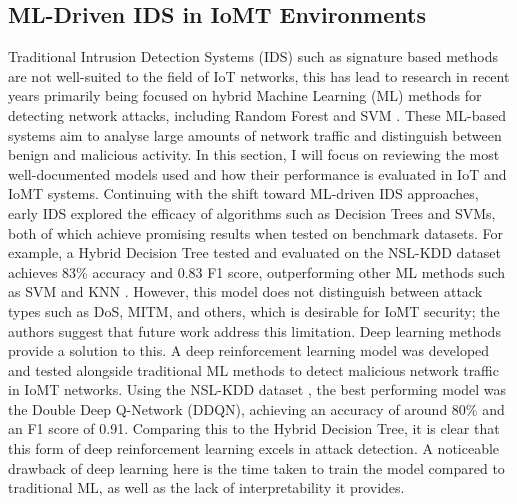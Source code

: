 \documentclass[11pt,a4paper]{article}
\begin{document}
\subsection{ML-Driven IDS in IoMT Environments}
Traditional Intrusion Detection Systems (IDS) such as signature based methods are not well-suited to the field of IoT networks, this has lead to research in recent years primarily being focused on hybrid Machine Learning (ML) methods for detecting network attacks, including Random Forest and SVM \cite{da2019internet}. These ML-based systems aim to analyse large amounts of network traffic and distinguish between benign and malicious activity. In this section, I will focus on reviewing the most well-documented models used and how their performance is evaluated in IoT and IoMT systems.
Continuing with the shift toward ML-driven IDS approaches, early IDS explored the efficacy of algorithms such as Decision Trees and SVMs, both of which achieve promising results when tested on benchmark datasets. For example, a Hybrid Decision Tree tested and evaluated on the NSL-KDD dataset \cite{5356528} achieves 83\% accuracy and 0.83 F1 score, outperforming other ML methods such as SVM and KNN \cite{taghavinejad2020intrusion}. However, this model does not distinguish between attack types such as DoS, MITM, and others, which is desirable for IoMT security; the authors suggest that future work address this limitation.
Deep learning methods provide a solution to this. A deep reinforcement learning model was developed and tested alongside traditional ML methods to detect malicious network traffic in IoMT networks. Using the NSL-KDD dataset \cite{5356528}, the best performing model was the Double Deep Q-Network (DDQN), achieving an accuracy of around 80\% and an F1 score of 0.91\cite{lopez2020application}. Comparing this to the Hybrid Decision Tree, it is clear that this form of deep reinforcement learning excels in attack detection. A noticeable drawback of deep learning here is the time taken to train the model compared to traditional ML, as well as the lack of interpretability it provides.
\end{document}
